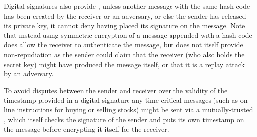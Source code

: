 Digital signatures also provide , unless another message
with the same hash code has been created by the receiver or an adversary,
or else the sender has released its private key,
it cannot deny having placed its signature on the message.
Note that instead using symmetric encryption of a message appended with a hash code does
allow the receiver to authenticate the message, but does not itself
provide non-repudiation as the sender could claim that the receiver (who also
holds the secret key) might have produced the message itself, or that it is a
replay attack by an adversary.

To avoid disputes between the sender and receiver over the validity of the timestamp
provided in a digital signature any time-critical messages (such as on-line instructions
for buying or selling stocks) might be sent via a mutually-trusted ,
which itself checks the signature of the sender and puts its own timestamp on the
message before encrypting it itself for the receiver.

